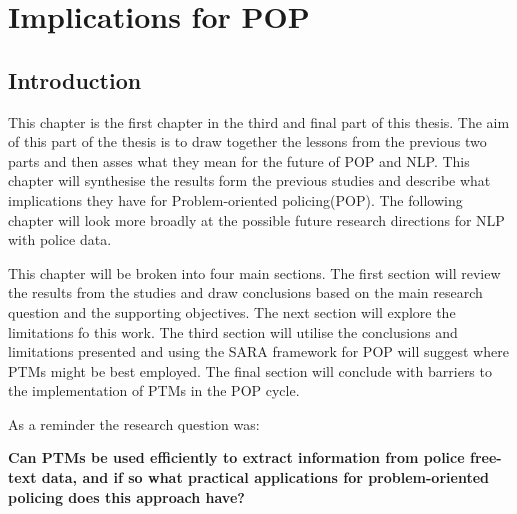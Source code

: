 \chapter{Implications for POP}


\section{Introduction} This chapter is the first chapter in the third and final part of this thesis. The aim of this part of the thesis is to draw together the lessons from the previous two parts and then asses what they mean for the future of POP and NLP.  This chapter will synthesise the results form the previous studies and describe what implications they have for Problem-oriented policing(POP). The following chapter will look more broadly at the possible future research directions for NLP with police data.

This chapter will be broken into four main sections. The first section will review the results from the studies and draw conclusions based on the main research question and the supporting objectives. The next section will explore the limitations fo this work. The third section will utilise the conclusions and limitations presented and using the SARA framework for POP will suggest where PTMs might be best employed. The final section will conclude with barriers to the implementation of PTMs in the POP cycle.

As a reminder the research question was:

\textbf{Can PTMs be used efficiently to extract information from police free-text data, and if so what practical applications for problem-oriented policing does this approach have?}

